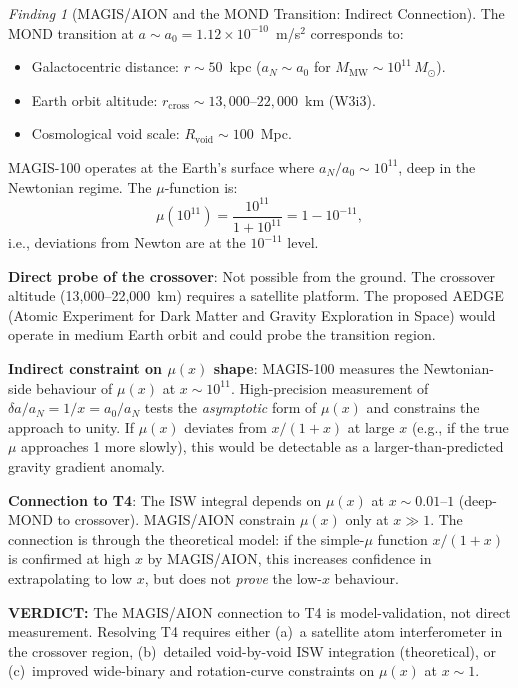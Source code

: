 \documentclass[11pt]{article}
\theoremstyle{definition}
\theoremstyle{remark}
\newtheorem{finding}[theorem]{Finding}
\newcommand{\ee}[1]{\times10^{#1}}
\newcommand{\Msun}{M_\odot}
\newcommand{\azero}{a_0}
\newcommand{\verdict}[1]{\textcolor{green!50!black}{\textbf{VERDICT:} #1}}
\begin{document}
\begin{finding}[MAGIS/AION and the MOND Transition: Indirect Connection]
\label{find:mond-transition}
The MOND transition at $a \sim \azero = 1.12\ee{-10}$~m/s$^2$ corresponds
to:
\begin{itemize}[nosep]
\item Galactocentric distance: $r \sim 50$~kpc ($a_N \sim \azero$ for
  $M_{\mathrm{MW}} \sim 10^{11}\,\Msun$).
\item Earth orbit altitude: $r_{\mathrm{cross}} \sim 13{,}000$--$22{,}000$~km
  (W3i3).
\item Cosmological void scale: $R_{\mathrm{void}} \sim 100$~Mpc.
\end{itemize}

MAGIS-100 operates at the Earth's surface where $a_N/\azero \sim 10^{11}$,
deep in the Newtonian regime. The $\mu$-function is:
\begin{equation}
\mu(10^{11}) = \frac{10^{11}}{1 + 10^{11}} = 1 - 10^{-11},
\end{equation}
i.e., deviations from Newton are at the $10^{-11}$ level.

\textbf{Direct probe of the crossover}: Not possible from the ground.
The crossover altitude (13,000--22,000~km) requires a satellite platform.
The proposed AEDGE (Atomic Experiment for Dark Matter and Gravity
Exploration in Space) would operate in medium Earth orbit and could
probe the transition region.

\textbf{Indirect constraint on $\mu(x)$ shape}: MAGIS-100 measures
the Newtonian-side behaviour of $\mu(x)$ at $x \sim 10^{11}$. High-precision
measurement of $\delta a/a_N = 1/x = \azero/a_N$ tests the \emph{asymptotic}
form of $\mu(x)$ and constrains the approach to unity. If $\mu(x)$ deviates
from $x/(1+x)$ at large $x$ (e.g., if the true $\mu$ approaches 1 more
slowly), this would be detectable as a larger-than-predicted gravity
gradient anomaly.

\textbf{Connection to T4}: The ISW integral depends on $\mu(x)$ at
$x \sim 0.01$--$1$ (deep-MOND to crossover). MAGIS/AION constrain
$\mu(x)$ only at $x \gg 1$. The connection is through the theoretical
model: if the simple-$\mu$ function $x/(1+x)$ is confirmed at high $x$
by MAGIS/AION, this increases confidence in extrapolating to low $x$,
but does not \emph{prove} the low-$x$ behaviour.

\verdict{The MAGIS/AION connection to T4 is model-validation, not
direct measurement. Resolving T4 requires either (a)~a satellite atom
interferometer in the crossover region, (b)~detailed void-by-void ISW
integration (theoretical), or (c)~improved wide-binary and rotation-curve
constraints on $\mu(x)$ at $x \sim 1$.}
\end{finding}
\end{document}
